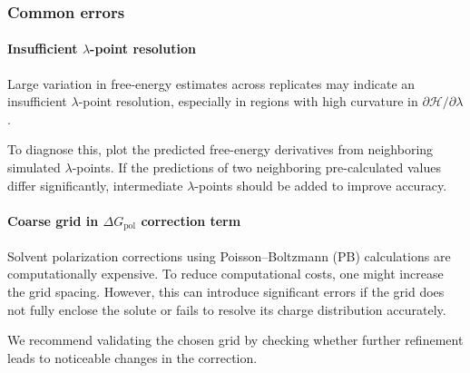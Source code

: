 \subsubsection{Common errors}

\paragraph{Insufficient $\lambda$-point resolution}
Large variation in free-energy estimates across replicates may indicate an insufficient $\lambda$-point resolution, especially in regions with high curvature in $\partial\mathcal{H}/\partial\lambda$.

To diagnose this, plot the predicted free-energy derivatives from neighboring simulated $\lambda$-points. If the predictions of two neighboring pre-calculated values differ significantly, intermediate $\lambda$-points should be added to improve accuracy.

\paragraph{Coarse grid in $\Delta G_{\text{pol}}$ correction term}
Solvent polarization corrections using Poisson–Boltzmann (PB) calculations are computationally expensive.
To reduce computational costs, one might increase the grid spacing. However, this can introduce significant errors if the grid does not fully enclose the solute or fails to resolve its charge distribution accurately.

We recommend validating the chosen grid by checking whether further refinement leads to noticeable changes in the correction.


